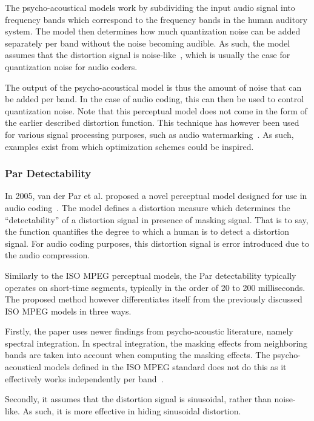 The psycho-acoustical models work by subdividing the input audio signal into frequency bands which correspond to the 
frequency bands in the human auditory system.
The model then determines how much quantization noise can be added separately per band without the noise becoming audible.
As such, the model assumes that the distortion signal is noise-like~\cite{van2005perceptual}, which is usually
the case for quantization noise for audio coders.

The output of the psycho-acoustical model is thus the amount of noise that can be added per band.
In the case of audio coding, this can then be used to control quantization noise.
Note that this perceptual model does not come in the form of the earlier described distortion function.
This technique has however been used for various signal processing purposes, 
such as audio watermarking~\cite{taal2012low}.
As such, examples exist from which optimization schemes could be inspired.

\subsubsection{Par Detectability}
In 2005, van der Par et al. proposed a novel perceptual model designed for use in audio coding~\cite{van2005perceptual}.
The model defines a distortion measure which determines the ``detectability'' of a distortion signal 
in presence of  masking signal.
That is to say, the function quantifies the degree to which a human is to detect a distortion signal.
For audio coding purposes, this distortion signal is error introduced due to the audio compression.

Similarly to the ISO MPEG perceptual models, the Par detectability typically operates on short-time segments, typically in the order of 20 to 200 milliseconds.
The proposed method however differentiates itself from the previously discussed ISO MPEG models in three ways.

Firstly, the paper uses newer findings from psycho-acoustic literature, namely spectral integration.
In spectral integration, the masking effects from neighboring bands are taken into account when computing the 
masking effects.
The psycho-acoustical models defined in the ISO MPEG standard does not do this as it effectively 
works independently per band~\cite{taal2012low}.

Secondly, it assumes that the distortion signal is sinusoidal, rather than noise-like.
As such, it is more effective in hiding sinusoidal distortion.

